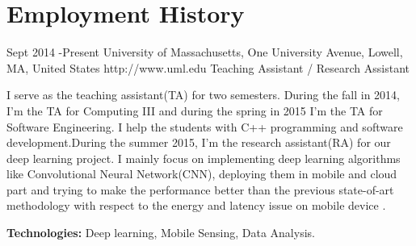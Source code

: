 \documentclass[10pt]{article} %
\begin{document}



\section{Employment History}

\job
{Sept 2014 -}{Present}
{University of Massachusetts, One University Avenue, Lowell, MA, United States}
{http://www.uml.edu}
{Teaching Assistant / Research Assistant}
{I serve as the teaching assistant(TA) for two semesters. 
During the fall in 2014, I'm the TA for Computing III and during the spring in 2015 I'm the TA for Software Engineering. I help the students with C++ programming and software development.During the summer 2015, I'm the research assistant(RA) for our deep learning project. I mainly focus on implementing deep learning algorithms like Convolutional Neural Network(CNN), deploying them in mobile and cloud part and trying to make the performance better than the previous state-of-art methodology with respect to the energy and latency issue on mobile device .\\ 
\rule{0mm}{5mm}\textbf{Technologies:} Deep learning, Mobile Sensing, Data Analysis.}

\end{document}
